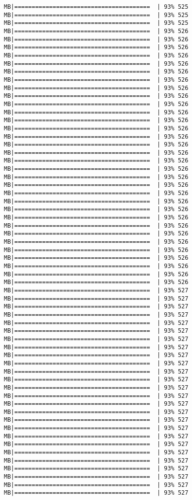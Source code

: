 \documentclass[
]{article}
\begin{document}
\begin{verbatim}
MB|=======================================  | 93% 525 MB|=======================================  | 93% 525 MB|=======================================  | 93% 525 MB|=======================================  | 93% 526 MB|=======================================  | 93% 526 MB|=======================================  | 93% 526 MB|=======================================  | 93% 526 MB|=======================================  | 93% 526 MB|=======================================  | 93% 526 MB|=======================================  | 93% 526 MB|=======================================  | 93% 526 MB|=======================================  | 93% 526 MB|=======================================  | 93% 526 MB|=======================================  | 93% 526 MB|=======================================  | 93% 526 MB|=======================================  | 93% 526 MB|=======================================  | 93% 526 MB|=======================================  | 93% 526 MB|=======================================  | 93% 526 MB|=======================================  | 93% 526 MB|=======================================  | 93% 526 MB|=======================================  | 93% 526 MB|=======================================  | 93% 526 MB|=======================================  | 93% 526 MB|=======================================  | 93% 526 MB|=======================================  | 93% 526 MB|=======================================  | 93% 526 MB|=======================================  | 93% 526 MB|=======================================  | 93% 526 MB|=======================================  | 93% 526 MB|=======================================  | 93% 526 MB|=======================================  | 93% 526 MB|=======================================  | 93% 526 MB|=======================================  | 93% 526 MB|=======================================  | 93% 526 MB|=======================================  | 93% 527 MB|=======================================  | 93% 527 MB|=======================================  | 93% 527 MB|=======================================  | 93% 527 MB|=======================================  | 93% 527 MB|=======================================  | 93% 527 MB|=======================================  | 93% 527 MB|=======================================  | 93% 527 MB|=======================================  | 93% 527 MB|=======================================  | 93% 527 MB|=======================================  | 93% 527 MB|=======================================  | 93% 527 MB|=======================================  | 93% 527 MB|=======================================  | 93% 527 MB|=======================================  | 93% 527 MB|=======================================  | 93% 527 MB|=======================================  | 93% 527 MB|=======================================  | 93% 527 MB|=======================================  | 93% 527 MB|=======================================  | 93% 527 MB|=======================================  | 93% 527 MB|=======================================  | 93% 527 MB|=======================================  | 93% 527 MB|=======================================  | 93% 527 MB|=======================================  | 93% 527 MB|=======================================  | 93% 527 
\end{verbatim}
\end{document}

